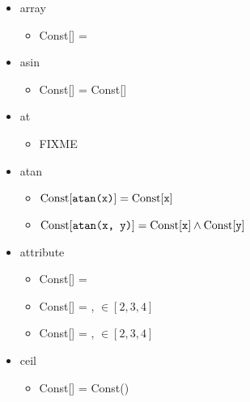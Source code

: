 \documentclass{article}
\begin{document}
\begin{itemize}
\begin{itemize}
\end{itemize}\item array \begin{itemize}
\item Const[] = \false

\end{itemize}\item asin \begin{itemize}
\item Const[] = Const[]

\end{itemize}\item at \begin{itemize}
\item FIXME

\end{itemize}\item atan \begin{itemize}
\item $\textrm{Const}[\texttt{atan(x)}] = \textrm{Const}[\texttt{x}]$
\item $\textrm{Const}[\texttt{atan(x, y)}] = \textrm{Const}[\texttt{x}] \land \textrm{Const}[\texttt{y}]$

\end{itemize}\item attribute \begin{itemize}
\item Const[] = \false
\item Const[] = \false,  $\in [2, 3, 4]$
\item Const[] = \false,  $\in [2, 3, 4]$

\end{itemize}\item ceil \begin{itemize}
\item Const[] = Const()
\end{itemize}
\end{itemize}
\end{document}
